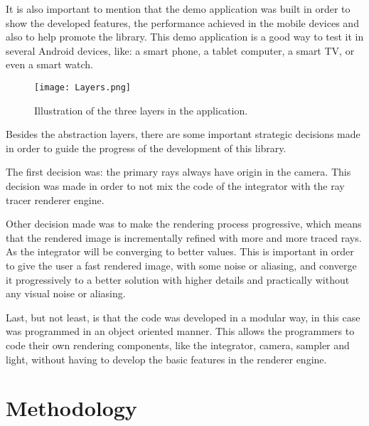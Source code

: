 \par
It is also important to mention that the demo application was built in order to show the developed features, the performance achieved in the mobile devices and also to help promote the library.
This demo application is a good way to test it in several Android devices, like: a smart phone, a tablet computer, a smart TV, or even a smart watch.

\begin{figure}[H]
	\centering
	\caption{Illustration of the three layers in the application.}
	\label{Illustration of the three layers in the application.}
	\texttt{[image: Layers.png]}
\end{figure}

\par
Besides the abstraction layers, there are some important strategic decisions made in order to guide the progress of the development of this library.

\par
The first decision was: the primary rays always have origin in the camera.
This decision was made in order to not mix the code of the integrator with the ray tracer renderer engine.

\par
Other decision made was to make the rendering process progressive, which means that the rendered image is incrementally refined with more and more traced rays.
As the integrator will be converging to better values.
This is important in order to give the user a fast rendered image, with some noise or aliasing, and converge it progressively to a better solution with higher details and practically without any visual noise or aliasing.

\par
Last, but not least, is that the code was developed in a modular way, in this case was programmed in an object oriented manner.
This allows the programmers to code their own rendering components, like the integrator, camera, sampler and light, without having to develop the basic features in the renderer engine.

\section{Methodology}

